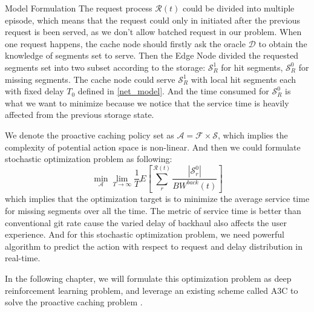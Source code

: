 \documentclass{article}
\begin{document}
\begin{section}{Model Formulation}
    The request process $\mathcal{R}(t)$ could be divided into multiple episode, which means that the request could only in initiated after the previous request is been served, as we don't allow batched request in our problem. When one request happens, the cache node should firstly ask the oracle $\mathcal{D}$ to obtain the knowledge of segments set to serve. Then the Edge Node divided the requested segments set into two subset according to the storage: $\mathcal{S}_R^{1}$ for hit segments, $\mathcal{S}_R^{0}$ for missing segments.
    The cache node could serve $\mathcal{S}_R^{1}$ with local hit segments each with fixed delay $T_0$ defined in \ref{net_model}. And the time consumed for $\mathcal{S}_R^{0}$ is what we want to minimize because we notice that the service time is heavily affected from the previous storage state.

    We denote the proactive caching policy set as $\mathcal{A} =\mathcal{F} \times \mathcal{S}$, which implies the complexity of potential action space is non-linear. And then we could formulate stochastic optimization problem as following:
    $$
    \min_{\mathcal{A}} \lim_{T \to \infty} \frac{1}{T} E[\sum_r^{\mathcal{R}(t)} \frac{|\mathcal{S}_{r}^{0}|}{BW^{back}(t)}]
    $$
    which implies that the optimization target is to minimize the average service time for missing segments over all the time. The metric of service time is better than conventional git rate cause the varied delay of backhaul also affects the user experience. And for this stochastic optimization problem, we need powerful algorithm to predict the action with respect to request and delay distribution in real-time.

    In the following chapter, we will formulate this optimization problem as deep reinforcement learning problem, and leverage an existing scheme called A3C to solve the proactive caching problem \cite{a3c}.
\end{section}
\end{document}
